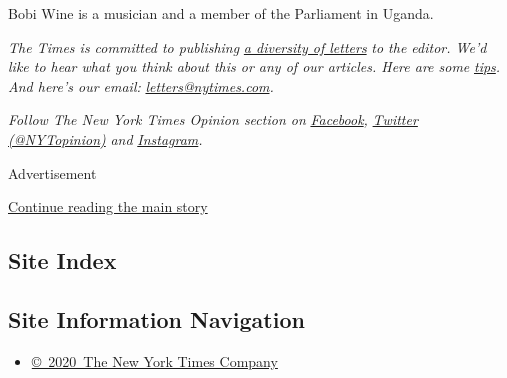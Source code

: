 Bobi Wine is a musician and a member of the Parliament in Uganda.

\emph{The Times is committed to publishing}
\href{https://www.nytimes.com/2019/01/31/opinion/letters/letters-to-editor-new-york-times-women.html}{\emph{a
diversity of letters}} \emph{to the editor. We'd like to hear what you
think about this or any of our articles. Here are some}
\href{https://help.nytimes.com/hc/en-us/articles/115014925288-How-to-submit-a-letter-to-the-editor}{\emph{tips}}\emph{.
And here's our email:}
\href{mailto:letters@nytimes.com}{\emph{letters@nytimes.com}}\emph{.}

\emph{Follow The New York Times Opinion section on}
\href{https://www.facebook.com/nytopinion}{\emph{Facebook}}\emph{,}
\href{http://twitter.com/NYTOpinion}{\emph{Twitter (@NYTopinion)}}
\emph{and}
\href{https://www.instagram.com/nytopinion/}{\emph{Instagram}}\emph{.}

Advertisement

\protect\hyperlink{after-bottom}{Continue reading the main story}

\hypertarget{site-index}{%
\subsection{Site Index}\label{site-index}}

\hypertarget{site-information-navigation}{%
\subsection{Site Information
Navigation}\label{site-information-navigation}}

\begin{itemize}
\tightlist
\item
  \href{https://help.nytimes.com/hc/en-us/articles/115014792127-Copyright-notice}{©~2020~The
  New York Times Company}
\end{itemize}

